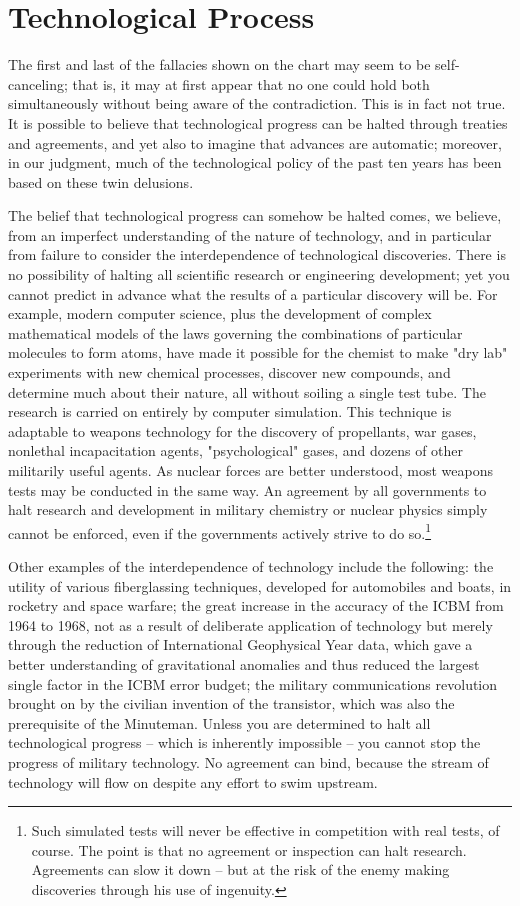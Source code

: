 \medskip

\section{Technological Process}
The first and last of the fallacies shown on the chart may seem to be self-canceling; that is, it may at first appear that no one could hold both simultaneously without being aware of the contradiction. This is in fact not true. It is possible to believe that technological progress can be halted through treaties and agreements, and yet also to imagine that advances are automatic; moreover, in our judgment, much of the technological policy of the past ten years has been based on these twin delusions.

The belief that technological progress can somehow be halted comes, we believe, from an imperfect understanding of the nature of technology, and in particular from failure to consider the interdependence of technological discoveries. There is no possibility of halting all scientific research or engineering development; yet you cannot predict in advance what the results of a particular discovery will be. For example, modern computer science, plus the development of complex mathematical models of the laws governing the combinations of particular molecules to form atoms, have made it possible for the chemist to make "dry lab" experiments with new chemical processes, discover new compounds, and determine much about their nature, all without soiling a single test tube. The research is carried on entirely by computer simulation. This technique is adaptable to weapons technology for the discovery of propellants, war gases, nonlethal incapacitation agents, "psychological" gases, and dozens of other militarily useful agents. As nuclear forces are better understood, most weapons tests may be conducted in the same way. An agreement by all governments to halt research and development in military chemistry or nuclear physics simply cannot be enforced, even if the governments actively strive to do so.\footnote{Such simulated tests will never be effective in competition with real tests, of course. The point is that no agreement or inspection can halt research. Agreements can slow it down -- but at the risk of the enemy making discoveries through his use of ingenuity.}

Other examples of the interdependence of technology include the following: the utility of various fiberglassing techniques, developed for automobiles and boats, in rocketry and space warfare; the great increase in the accuracy of the ICBM from 1964 to 1968, not as a result of deliberate application of technology but merely through the reduction of International Geophysical Year data, which gave a better understanding of gravitational anomalies and thus reduced the largest single factor in the ICBM error budget; the military communications revolution brought on by the civilian invention of the transistor, which was also the prerequisite of the Minuteman. Unless you are determined to halt all technological progress -- which is inherently impossible -- you cannot stop the progress of military technology. No agreement can bind, because the stream of technology will flow on despite any effort to swim upstream.

